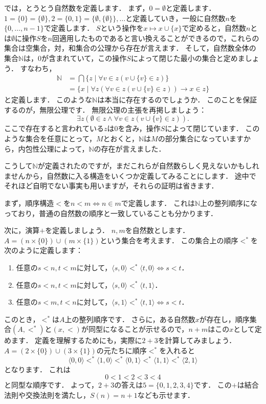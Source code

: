 \documentclass[./main]{subfiles}
\newcommand{\mbb}{\mathbb}
\begin{document}
では，とうとう自然数を定義します．
まず，$0=\emptyset$と定義します．
$1=\{0\}=\{\emptyset\}, 2=\{0, 1\}=\{\emptyset,\{\emptyset\}\},\ldots$と定義していき，一般に自然数$n$を$\{0,\ldots,n-1\}$で定義します．
$S$という操作を$x\mapsto x\cup\{x\}$で定めると，自然数$n$とは$\emptyset$に操作$S$を$n$回適用したものであると言い換えることができるので，これらの集合は空集合，対，和集合の公理から存在が言えます．
そして，自然数全体の集合$\mbb{N}$は，$0$が含まれていて，この操作$S$によって閉じた最小の集合と定めましょう．
すなわち，
\begin{align*}
\mbb{N} &=\bigcap\{z\mid\forall v\in z(v\cup\{v\}\in z)\}\\
&=\{x\mid\forall z(\forall v\in z(v\cup\{v\}\in z))\to x\in z\}
\end{align*}
と定義します．
このような$\mbb{N}$は本当に存在するのでしょうか．
このことを保証するのが，無限公理です．
無限公理の主張を再掲しましょう：
\[
\exists z(\emptyset\in z\wedge\forall v\in z(v\cup\{v\}\in z)).
\]
ここで存在すると言われている$z$は0を含み，操作$S$によって閉じています．
このような集合を任意にとって，$M$とおくと，$\mbb{N}$は$M$の部分集合になっていますから，内包性公理によって，$\mbb{N}$の存在が言えました．

こうして$\mbb{N}$が定義されたのですが，まだこれらが自然数らしく見えないかもしれませんから，自然数に入る構造をいくつか定義してみることにします．
途中でそれほど自明でない事実も用いますが，それらの証明は省きます．

まず，順序構造$<$を$n<m\iff n\in m$で定義します．
これは$\mbb{N}$上の整列順序になっており，普通の自然数の順序と一致していることも分かります．

次に，演算$+$を定義しましょう．
$n, m$を自然数とします．
$A=(n\times\{0\})\cup(m\times\{1\})$という集合を考えます．
この集合上の順序$<^{*}$を次のように定義します：
\begin{enumerate}
\item 任意の$s<n, t<m$に対して，$\langle s, 0\rangle <^{*}\langle t, 0\rangle\iff s<t$．
\item 任意の$s<n, t<m$に対して，$\langle s, 0\rangle <^{*} \langle t, 1\rangle$．
\item 任意の$s<m, t<n$に対して，$\langle s, 1\rangle <^{*}\langle t, 1\rangle\iff s<t$．
\end{enumerate}
このとき，$<^{*}$は$A$上の整列順序です．
さらに，ある自然数$x$が存在し，順序集合$(A, <^{*})$と$(x, <)$が同型になることが示せるので，$n+m$はこの$x$として定めます．
定義を理解するためにも，実際に$2+3$を計算してみましょう．
$A=(2\times\{0\})\cup(3\times\{1\})$の元たちに順序$<^{*}$を入れると
\[
\langle 0, 0\rangle <^{*} \langle 1, 0\rangle <^{*} \langle 0, 1\rangle <^{*} \langle 1, 1 \rangle <^{*} \langle 2, 1 \rangle
\]
となります．
これは
\[
0 < 1 < 2 < 3 < 4
\]
と同型な順序です．
よって，$2+3$の答えは$5=\{0, 1, 2, 3, 4\}$です．
この$+$は結合法則や交換法則を満たし，$S(n)=n+1$なども示せます．
\end{document}
